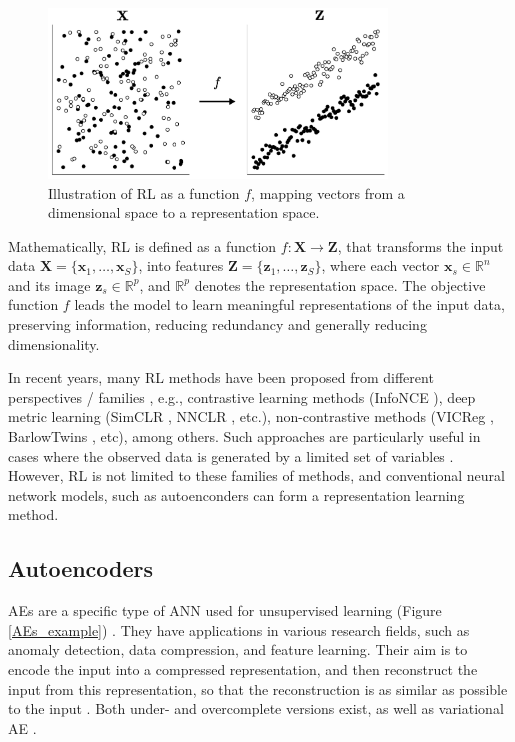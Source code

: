\documentclass[journal,article,submit,pdftex,moreauthors]{Definitions/mdpi}
\begin{document}
\begin{figure}[H]
	\centering
	\includegraphics[width=9cm]{figures/representation_learning.pdf}
	 \caption{Illustration of RL as a function $f$, mapping vectors from a dimensional space to a representation space.}
	\label{}      
	\centering
\end{figure}

Mathematically, RL is defined as a function $f : \mathbf{X} \to \mathbf{Z}$, that transforms the input data $\mathbf{X} = \{\mathbf{x}_1, \dots, \mathbf{x}_S\}$, into features $\mathbf{Z} = \{\mathbf{z}_1, \dots, \mathbf{z}_S\}$, where each vector $\mathbf{x}_s \in \mathbb{R}^n$ and its image $\mathbf{z}_s \in \mathbb{R}^p$, and $\mathbb{R}^p$ denotes the representation space.
The objective function $f$ leads the model to learn meaningful representations of the input data, preserving information, reducing redundancy and generally reducing dimensionality.

In recent years, many RL methods have been proposed from different perspectives / families \cite{Balestriero2023}, 
e.g., contrastive learning methods (InfoNCE \cite{Tschannen2019,LeKhac2020,Aitchison2021}), deep metric learning (SimCLR \cite{Chen2020,Bachman2019}, NNCLR \cite{Dwibedi2021}, etc.), non-contrastive methods (VICReg \cite{Bardes2021}, BarlowTwins \cite{Zbontar2021,Lisaius2024}, etc), among others.
Such approaches are particularly useful in cases where the observed data is generated by a limited set of variables \cite{Coifman2006}. 
However, RL is not limited to these families of methods, and conventional neural network models, such as autoenconders can form a representation 
learning method.

\subsection{Autoencoders}\label{aes}
AEs are a specific type of ANN used for unsupervised learning (Figure \ref{AEs_example}) \cite{Bank2020}. They have applications in various research fields, such as anomaly detection, 
data compression, and feature learning. Their aim is to encode the input into a compressed representation, and then reconstruct the input from this representation, so that the reconstruction is as similar as possible to the input \cite{Tzelepi2022,Zhang2019}. 
Both under- and overcomplete versions exist, as well as variational AE \cite{Valero2021}.
\end{document}
